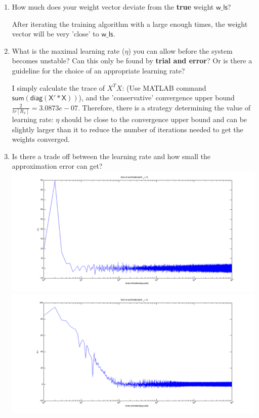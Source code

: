 \documentclass[12pt]{article}
\begin{document}
\begin{enumerate}
	\item How much does your weight vector deviate from the {\bf true} weight $\mathsf{w\_ls}$?
	\begin{flushleft}
		After iterating the training algorithm with a large enough times, the weight vector will be very 'close' to $\mathsf{w\_ls}$.
	\end{flushleft}
	\newpage
	\item What is the maximal learning rate ($\eta$) you can allow before the system becomes unstable? 
		Can this only be found by {\bf trial and error}? Or is there a guideline for the choice of an appropriate learning rate?
	\begin{flushleft}
		I simply calculate the trace of $X^TX$: (Use MATLAB command $\mathsf{sum(diag(X'*X))}$), and the 'conservative' convergence upper bound $\frac{2}{tr[R_x]} = 3.0873e-07$. Therefore, there is a strategy determining the value of learning rate: $\eta$ should be close to the convergence upper bound and can be slightly larger than it to reduce the number of iterations needed to get the weights converged.
	\end{flushleft}
	\item Is there a trade off between the learning rate and how small the approximation error can get?
	\hspace*{-6em}
	\includegraphics[scale=.25]{../res/error_std1_eta5.png}
	\hspace*{-2.5em}
	\includegraphics[scale=.25]{../res/error_std1_eta7-7.png}

\end{enumerate}
\end{document}
